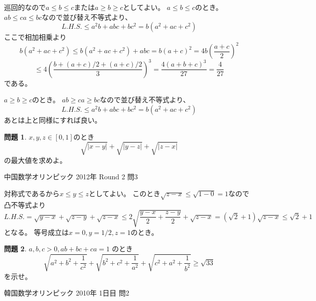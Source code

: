 \documentclass[uplatex, a5paper]{jsarticle}
\makeatletter
\theoremstyle{definition}
\newtheorem{prob}{問題}
\renewenvironment{proof}[1][\proofname]{
  \pushQED{\qed}%
  \normalfont \topsep6\p@\@plus6\p@\relax
  \trivlist
  \item[\hskip\labelsep
    #1\@addpunct{\textbf{.}}]\ignorespaces
}{%
  \popQED\endtrivlist\@endpefalse
}
\providecommand{\proofname}{証明}
\newcommand{\lhs }{ L.H.S. }
\def\qed{\hfill $\Box$}
\makeatother
\begin{document}
\begin{proof}
  巡回的なので\(a \leq b \leq c\)または\(a\geq b\geq c\)としてよい。
  \(a \leq b \leq c\)のとき。
  \(ab \leq ca \leq bc\)なので並び替え不等式より、
  \[
  \lhs \leq a^2b + abc + bc^2 = b(a^2+ac+c^2)
  \]
  ここで相加相乗より
  \[
  b(a^2+ac+c^2) \leq b(a^2+ac+c^2) + abc = b(a+c)^2 = 4b\left( \frac{a+c}{2} \right) ^2
  \]
  \[
  \leq 4\left( \frac{ b+ (a+c)/2 + (a+c)/2 }{3} \right) ^3 = \frac{ 4(a+b+c)^3 }{27} = \frac{4}{27}
  \]
  である。

  \(a \geq b \geq c\)のとき。
  \(ab \geq ca \geq bc\)なので並び替え不等式より、
  \[
  \lhs \leq a^2b + abc + bc^2 = b(a^2+ac+c^2)
  \]
  あとは上と同様にすれば良い。
\end{proof}










\newpage

\begin{prob}
  \(x , y , z \in [0,1]\)のとき
  \[
  \sqrt{ |x-y| } + \sqrt{ |y-z| } + \sqrt{ |z-x| }
  \]
  の最大値を求めよ。
  \begin{flushright}
    中国数学オリンピック 2012年 Round 2 問3
  \end{flushright}
\end{prob}


\begin{proof}
  対称式であるから\(x \leq y \leq z \)としてよい。
  このとき\(\sqrt{z-x} \leq \sqrt{1-0} = 1\)なので凸不等式より
  \[
  \lhs = \sqrt{ y-x } + \sqrt{ z-y } + \sqrt{ z-x } \leq 2 \sqrt{ \frac{y-x}{2} + \frac{z-y}{2} } + \sqrt{ z-x }
  = \left( \sqrt{2} + 1 \right) \sqrt{ z-x } \leq \sqrt{2} + 1
  \]
  となる。
  等号成立は\(x=0,y=1/2,z=1\)のとき。
\end{proof}










\newpage

\begin{prob}
  \(a , b , c > 0 , ab+bc+ca = 1\)
  のとき
  \[
  \sqrt{a^2 + b^2 + \frac{1}{c^2}} + \sqrt{b^2 + c^2 + \frac{1}{a^2} } + \sqrt{c^2 + a^2 + \frac{1}{b^2} }
  \geq \sqrt{33}
  \]
  を示せ。
  \begin{flushright}
    韓国数学オリンピック 2010年 1日目 問2
  \end{flushright}
\end{prob}
\end{document}
